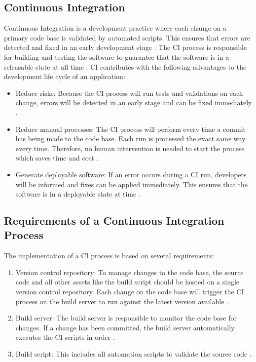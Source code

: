 \subsection{Continuous Integration}
Continuous Integration is a development practice where each change on a primary code base is validated by automated scripts. This ensures that errors are detected and fixed in an early development stage \cite{Duvall2007CI}.
The CI process is responsible for building and testing the software to guarantee that the software is in a releasable state at all time \cite{Rossel2017CICD}.
CI contributes with the following advantages to the development life cycle of an application:
\begin{itemize}
\item Reduce risks:
Because the CI process will run tests and validations on each change, errors will be detected in an early stage and can be fixed immediately \cite{Duvall2007CI}.

\item Reduce manual processes:
The CI process will perform every time a commit has being made to the code base.
Each run is processed the exact same way every time.
Therefore, no human intervention is needed to start the process which saves time and cost \cite{Duvall2007CI}.

\item Generate deployable software:
If an error occurs during a CI run, developers will be informed and fixes can be applied immediately.
This ensures that the software is in a deployable state at time \cite{Duvall2007CI}.
\end{itemize}


\subsection{Requirements of a Continuous Integration Process}
The implementation of a CI process is based on several requirements:
\begin{enumerate}
\item Version control repository:
To manage changes to the code base, the source code and all other assets like the build script should be hosted on a single version control repository.
Each change on the code base will trigger the CI process on the build server to run against the latest version available \cite{Duvall2007CI}.

\item Build server:
The build server is responsible to monitor the code base for changes.
If a change has been committed, the build server automatically executes the CI scripts in order \cite{Rossel2017CICD, Duvall2007CI}.

\item Build script:
This includes all automation scripts to validate the source code \cite{Duvall2007CI}.
\end{enumerate}


